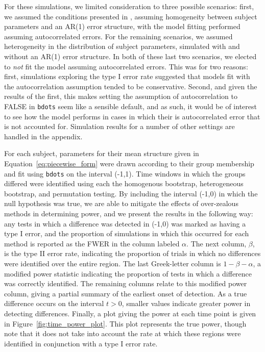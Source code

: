\documentclass{article}
\newcommand{\xt}{\texttt}
\begin{document}
For these simulations, we limited consideration to three possible scenarios: first, we assumed the conditions presented in \citet{oleson2017detecting}, assuming homogeneity between subject parameters and an AR(1) error structure, with the model fitting performed assuming autocorrelated errors. For the remaining scenarios, we assumed heterogeneity in the distribution of subject parameters, simulated with and without an AR(1) error structure. In both of these last two scenarios, we elected to \textit{not} fit the model assuming autocorrelated errors. This was for two reasons: first, simulations exploring the type I error rate suggested that models fit with the autocorrelation assumption tended to be conservative. Second, and given the results of the first, this makes setting the assumption of autocorrelation to FALSE in \xt{bdots} seem like a sensible default, and as such, it would be of interest to see how the model performs in cases in which their is autocorrelated error that is not accounted for. Simulation results for a number of other settings are handled in the appendix. 

For each subject, parameters for their mean structure given in Equation~\ref{eq:piecewise_form} were drawn according to their group membership and fit using \xt{bdots} on the interval (-1,1). Time windows in which the groups differed were identified using each the homogenous bootstrap, heterogeneous bootstrap, and permutation testing. By including the interval (-1,0) in which the null hypothesis was true, we are able to mitigate the effects of over-zealous methods in determining power, and we present the results in the following way: any tests in which a difference was detected in (-1,0) was marked as having a type I error, and the proportion of simulations in which this occurred for each method is reported as the FWER in the column labeled $\alpha$. The next column, $\beta$, is the type II error rate, indicating the proportion of trials in which no differences were identified over the entire region. The last Greek-letter column is $1 - \beta - \alpha$, a modified power statistic indicating the proportion of tests in which a difference was correctly identified. The remaining columns relate to this modified power column, giving a partial summary of the earliest onset of detection. As a true difference occurs on the interval $t > 0$, smaller values indicate greater power in detecting differences. Finally, a plot giving the power at each time point is given in Figure~\ref{fig:time_power_plot}. This plot represents the true power, though note that it does not take into account the rate at which these regions were identified in conjunction with a type I error rate. 
\end{document}
